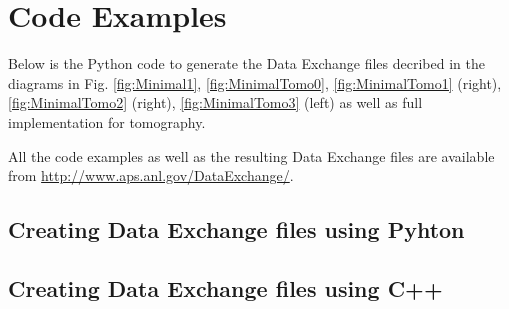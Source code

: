 \section{Code Examples}


Below is the Python code to generate the Data Exchange files decribed in the diagrams in Fig.  \ref{fig:Minimal1}, \ref{fig:MinimalTomo0}, \ref{fig:MinimalTomo1} (right), \ref{fig:MinimalTomo2} (right), \ref{fig:MinimalTomo3} (left) as well as full implementation for tomography.


All the code examples as well as the resulting Data Exchange files are available from \url{http://www.aps.anl.gov/DataExchange/}.

\hypersetup{linkcolor = white}
 
\newpage
\subsection{Creating Data Exchange files using Pyhton}




\newpage
{}


\newpage
{}


\newpage
{}


\newpage
{}


\newpage
{}


\newpage
{}


\hypersetup{linkcolor = softBlue}

\subsection{Creating Data Exchange files using C++}
